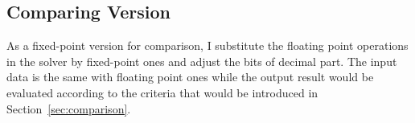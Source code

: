 \subsection{Comparing Version}
As a fixed-point version for comparison, I substitute the floating point operations in the \SA solver by fixed-point ones and adjust the bits of decimal part. The input data is the same with floating point ones while the output result would be evaluated according to the criteria that would be introduced in Section~\ref{sec:comparison}. 